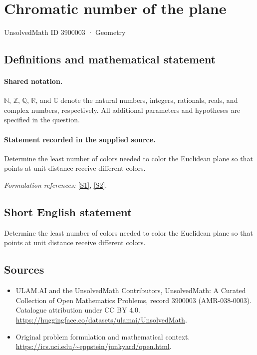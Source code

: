 \documentclass[11pt]{article}
\newcommand{\sref}[2]{\hyperlink{source:#1:#2}{[S#2]}}
\begin{document}
\setcounter{section}{3900002}
\section{Chromatic number of the plane}\label{3900003}
{\small UnsolvedMath ID 3900003 · Geometry}
\subsection{Definitions and mathematical statement}

\paragraph{Shared notation.}$\mathbb N$, $\mathbb Z$, $\mathbb Q$, $\mathbb R$, and $\mathbb C$ denote the natural numbers, integers, rationals, reals, and complex numbers, respectively. All additional parameters and hypotheses are specified in the question.


\paragraph{Statement recorded in the supplied source.}
Determine the least number of colors needed to color the Euclidean plane so that points at unit distance receive different colors.
\par\smallskip\textit{Formulation references:} \sref{3900003}{1}, \sref{3900003}{2}.
\subsection{Short English statement}
Determine the least number of colors needed to color the Euclidean plane so that points at unit distance receive different colors.
\subsection{Sources}
\begin{itemize}
\item[\hypertarget{source:3900003:1}{S1}] ULAM.AI and the UnsolvedMath Contributors, UnsolvedMath: A Curated Collection of Open Mathematics Problems, record 3900003 (AMR-038-0003). Catalogue attribution under CC BY 4.0.
\url{https://huggingface.co/datasets/ulamai/UnsolvedMath}.
\item[\hypertarget{source:3900003:2}{S2}] Original problem formulation and mathematical context.
\url{https://ics.uci.edu/~eppstein/junkyard/open.html}.
\end{itemize}
\label{end:3900003}
\end{document}
